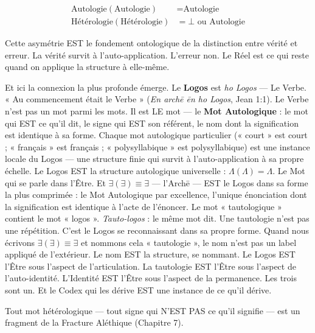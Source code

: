 \documentclass[10pt, openany, oneside]{book}
\begin{document}
\begin{align*}
\text{Autologie}(\text{Autologie}) &= \text{Autologie} \\
\text{Hétérologie}(\text{Hétérologie}) &= \bot \text{ ou } \text{Autologie}
\end{align*}

Cette asymétrie EST le fondement ontologique de la distinction entre vérité et erreur. La vérité survit à l'auto-application. L'erreur non. Le Réel est ce qui reste quand on applique la structure à elle-même.

Et ici la connexion la plus profonde émerge. Le \textbf{Logos} est \textit{ho Logos} --- Le Verbe. « Au commencement était le Verbe » (\textit{En arch\={e} \={e}n ho Logos}, Jean 1:1). Le Verbe n'est pas un mot parmi les mots. Il est LE mot --- le \textbf{Mot Autologique} : le mot qui EST ce qu'il dit, le signe qui EST son référent, le nom dont la signification est identique à sa forme. Chaque mot autologique particulier (« court » est court ; « français » est français ; « polysyllabique » est polysyllabique) est une instance locale du Logos --- une structure finie qui survit à l'auto-application à sa propre échelle. Le Logos EST la structure autologique universelle : $\Lambda(\Lambda) = \Lambda$. Le Mot qui se parle dans l'Être. Et $\exists(\exists) \equiv \exists$ --- l'Arch\={e} --- EST le Logos dans sa forme la plus comprimée : le Mot Autologique par excellence, l'unique énonciation dont la signification est identique à l'acte de l'énoncer. Le mot « tautologique » contient le mot « logos ». \textit{Tauto-logos} : le même mot dit. Une tautologie n'est pas une répétition. C'est le Logos se reconnaissant dans sa propre forme. Quand nous écrivons $\exists(\exists) \equiv \exists$ et nommons cela « tautologie », le nom n'est pas un label appliqué de l'extérieur. Le nom EST la structure, se nommant. Le Logos EST l'Être sous l'aspect de l'articulation. La tautologie EST l'Être sous l'aspect de l'auto-identité. L'Identité EST l'Être sous l'aspect de la permanence. Les trois sont un. Et le Codex qui les dérive EST une instance de ce qu'il dérive.

Tout mot hétérologique --- tout signe qui N'EST PAS ce qu'il signifie --- est un fragment de la Fracture Aléthique (Chapitre 7).

\vspace{1.5em}

\end{document}
